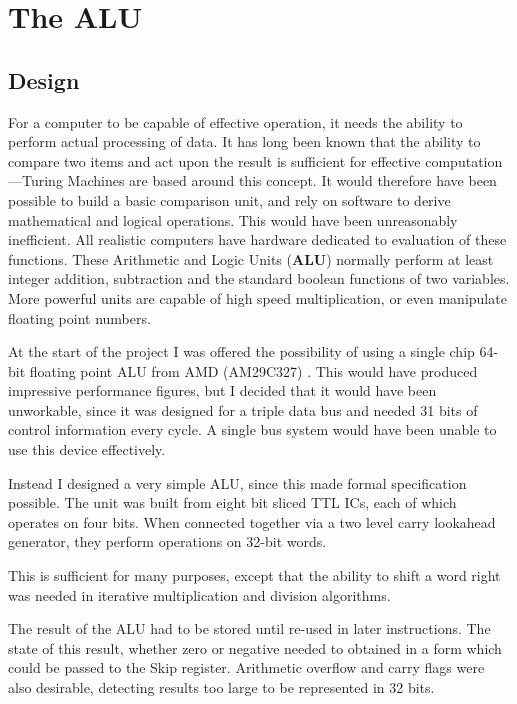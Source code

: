 \chapter{The ALU}

\section{Design}
For a computer to be capable of effective operation, it needs the ability to perform
 actual processing of data. 
It has long been known that the ability to compare two items and act upon the result is sufficient for effective computation 
---Turing Machines are based around this concept.
It would therefore have been possible to build a basic  comparison unit, and rely
on software  to derive mathematical and logical operations.
This would have been unreasonably  inefficient.
All realistic computers   have hardware dedicated to evaluation of these functions.
These Arithmetic and Logic Units ({\bf ALU}) normally perform at least integer addition, subtraction and the standard boolean functions of two variables.
More powerful units are capable of high speed multiplication, or even manipulate
floating point numbers.


At the start of the project I was offered the possibility of using a 
single chip 64-bit floating point ALU from AMD (AM29C327) \cite{amd:uprogramming,amd:29c300}.
This would have produced impressive performance figures, but I 
decided that it would have been unworkable, since it was 
designed for a triple data bus and needed 31 bits of control 
information every cycle. A single bus system would have  been unable to use this 
device effectively. 

Instead I designed a very simple ALU, since this made 
formal specification  possible. The unit was  
built from eight bit sliced TTL ICs, each of which  operates on four bits.
 When connected together via a two level 
 carry lookahead generator, they  perform   operations on 32-bit words.

This 
is sufficient for many purposes, except that the ability to shift 
a word  right was needed in iterative multiplication and division algorithms.

 The result of the ALU had to be stored until  re-used in later instructions.
The state of this result, 
whether zero or  negative  needed to obtained in a form
 which could be passed to the Skip register.
 Arithmetic overflow and carry flags were also desirable,
   detecting results too large to be represented in 32 bits.
 

